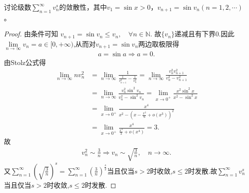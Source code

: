 \documentclass[../../main.tex]{subfiles}%
\begin{document}
\begin{example}
讨论级数$\sum\limits_{n=1}^{\infty} v_n^s$的敛散性，其中$v_1 = \sin x > 0$，$v_{n+1} = \sin v_n (n = 1, 2, \cdots)$。
\end{example}
\begin{proof}
由条件可知
$v_{n+1}=\sin v_n\leqslant v_n,\quad \forall n\in \mathbb{N} .$
故$\{ v_n \}$递减且有下界$0.$因此$\lim\limits_{n\rightarrow \infty}v_n=a\in [ 0,+\infty )$,从而对$v_{n+1}=\sin v_n$两边取极限得
\begin{align*}
a=\sin a\Longrightarrow a=0.
\end{align*}
由Stolz公式得
\begin{align*}
\lim\limits_{n\rightarrow \infty}nv_{n}^{2}&=\lim\limits_{n\rightarrow \infty}\frac{1}{\frac{1}{v_{n+1}^{2}}-\frac{1}{v_{n}^{2}}}=\lim\limits_{n\rightarrow \infty}\frac{v_{n}^{2}v_{n+1}^{2}}{v_{n}^{2}-v_{n+1}^{2}}
\\
&=\lim\limits_{n\rightarrow \infty}\frac{v_{n}^{2}\sin ^2v_n}{v_{n}^{2}-\sin ^2v_n}=\lim\limits_{x\rightarrow 0^+}\frac{x^2\sin ^2x}{x^2-\sin ^2x}
\\
&=\lim\limits_{x\rightarrow 0^+}\frac{x^4}{x^2-\left( x-\frac{x^3}{6}+o\left( x^3 \right) \right) ^2}
\\
&=\lim\limits_{x\rightarrow 0^+}\frac{x^4}{\frac{x^4}{3}+o\left( x^4 \right)}=3.
\end{align*}
故
\begin{align*}
v_{n}^{2}\sim \frac{3}{n}\Longrightarrow v_n\sim \sqrt{\frac{3}{n}},\quad n\rightarrow \infty .
\end{align*}
又$\sum_{n=1}^{\infty}{\left( \sqrt{\frac{3}{n}} \right) ^s}=\sum_{n=1}^{\infty}{\left( \frac{3}{n} \right) ^{\frac{s}{2}}}$当且仅当$s>2$时收敛,$s\leqslant 2$时发散.故$\sum_{n=1}^{\infty}{v_{n}^{s}}$当且仅当$s>2$时收敛,$s\leqslant 2$时发散.
\end{proof}
\end{document}
